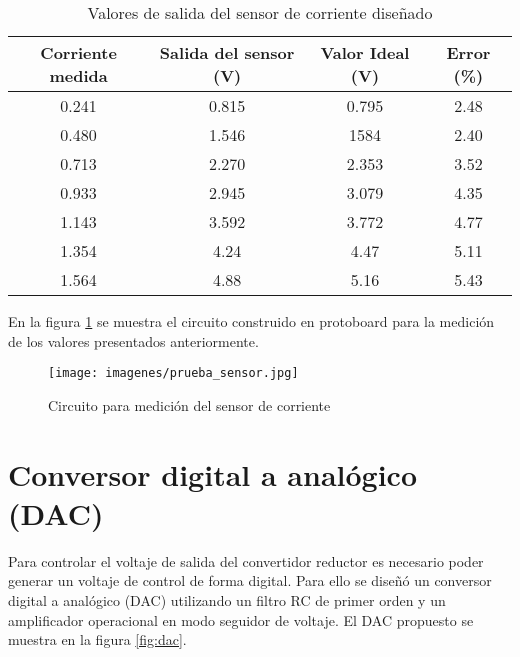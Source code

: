 \begin{table}[H]
    \centering
    \begin{tabular}{|c|c|c|c|}
        \hline
    Corriente medida & Salida del sensor (V) & Valor Ideal (V) & Error (\%) \\
    \hline
    0.241            & 0.815                 & 0.795           & 2.48       \\
    0.480            & 1.546                 & 1584            & 2.40       \\
    0.713            & 2.270                 & 2.353           & 3.52       \\
    0.933            & 2.945                 & 3.079           & 4.35       \\
    1.143            & 3.592                 & 3.772           & 4.77       \\
    1.354            & 4.24                  & 4.47            & 5.11       \\
    1.564            & 4.88                  & 5.16            & 5.43 \\
     \hline     
    \end{tabular}

    \caption{Valores de salida del sensor de corriente diseñado}
    \label{tb:mediciones_sensor}
    \end{table}


    En la figura \ref{fig:mediciones_sensor} se muestra el circuito construido
    en protoboard para la medición de los valores presentados anteriormente.

    \begin{figure}[H]
        \centering
        \texttt{[image: imagenes/prueba\_sensor.jpg]}
        \caption{Circuito para medición del sensor de corriente}
        \label{fig:mediciones_sensor}
    \end{figure}


\section{Conversor digital a analógico (DAC)}

    Para controlar el voltaje de salida del convertidor reductor es necesario
    poder generar un voltaje de control de forma digital. Para ello se diseñó
    un conversor digital a analógico (DAC) utilizando un filtro RC de primer
    orden y un amplificador operacional en modo seguidor de voltaje. El DAC
    propuesto se muestra en la figura \ref{fig:dac}.

